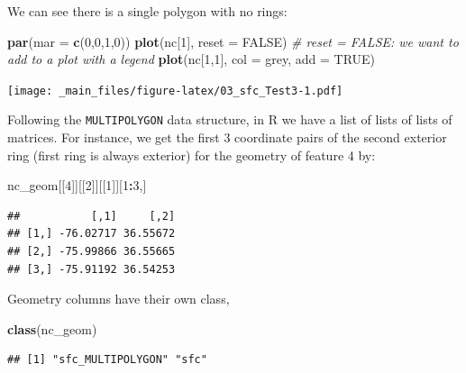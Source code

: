 \documentclass[
]{book}
\newenvironment{Shaded}{\begin{snugshade}}{\end{snugshade}}
\newcommand{\AttributeTok}[1]{\textcolor[rgb]{0.13,0.29,0.53}{#1}}
\newcommand{\CommentTok}[1]{\textcolor[rgb]{0.56,0.35,0.01}{\textit{#1}}}
\newcommand{\ConstantTok}[1]{\textcolor[rgb]{0.56,0.35,0.01}{#1}}
\newcommand{\DecValTok}[1]{\textcolor[rgb]{0.00,0.00,0.81}{#1}}
\newcommand{\FunctionTok}[1]{\textcolor[rgb]{0.13,0.29,0.53}{\textbf{#1}}}
\newcommand{\NormalTok}[1]{#1}
\newcommand{\SpecialCharTok}[1]{\textcolor[rgb]{0.81,0.36,0.00}{\textbf{#1}}}
\newcommand{\StringTok}[1]{\textcolor[rgb]{0.31,0.60,0.02}{#1}}
\begin{document}
We can see there is a single polygon with no rings:

\begin{Shaded}
\begin{Highlighting}[]
\FunctionTok{par}\NormalTok{(}\AttributeTok{mar =} \FunctionTok{c}\NormalTok{(}\DecValTok{0}\NormalTok{,}\DecValTok{0}\NormalTok{,}\DecValTok{1}\NormalTok{,}\DecValTok{0}\NormalTok{))}
\FunctionTok{plot}\NormalTok{(nc[}\DecValTok{1}\NormalTok{], }\AttributeTok{reset =} \ConstantTok{FALSE}\NormalTok{) }\CommentTok{\# reset = FALSE: we want to add to a plot with a legend}
\FunctionTok{plot}\NormalTok{(nc[}\DecValTok{1}\NormalTok{,}\DecValTok{1}\NormalTok{], }\AttributeTok{col =} \StringTok{\textquotesingle{}grey\textquotesingle{}}\NormalTok{, }\AttributeTok{add =} \ConstantTok{TRUE}\NormalTok{)}
\end{Highlighting}
\end{Shaded}

\texttt{[image: \_main\_files/figure-latex/03\_sfc\_Test3-1.pdf]}

Following the \texttt{MULTIPOLYGON} data structure, in R we have a list of lists of lists of matrices. For instance, we get the first 3 coordinate pairs of the second exterior ring (first ring is always exterior) for the geometry of feature 4 by:

\begin{Shaded}
\begin{Highlighting}[]
\NormalTok{nc\_geom[[}\DecValTok{4}\NormalTok{]][[}\DecValTok{2}\NormalTok{]][[}\DecValTok{1}\NormalTok{]][}\DecValTok{1}\SpecialCharTok{:}\DecValTok{3}\NormalTok{,]}
\end{Highlighting}
\end{Shaded}

\begin{verbatim}
##           [,1]     [,2]
## [1,] -76.02717 36.55672
## [2,] -75.99866 36.55665
## [3,] -75.91192 36.54253
\end{verbatim}

Geometry columns have their own class,

\begin{Shaded}
\begin{Highlighting}[]
\FunctionTok{class}\NormalTok{(nc\_geom)}
\end{Highlighting}
\end{Shaded}

\begin{verbatim}
## [1] "sfc_MULTIPOLYGON" "sfc"
\end{verbatim}
\end{document}
